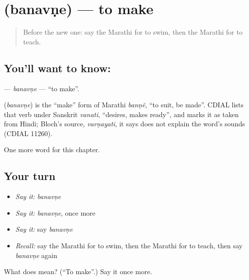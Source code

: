 \section[\texorpdfstring{\mr{बनवणे} (banavṇe)}{बनवणे (banavṇe)}]{ (banavṇe) — to make}

\label{lesson:MR-C82-banavne}



\begin{quote}
Before the new one: say the Marathi for to swim, then the Marathi for to teach.
\end{quote}

\subsection*{You'll want to know: }
\textbf{} — \emph{banavṇe} — \textquotedblleft{}to make\textquotedblright{}.

\begin{cousinweb}
\textbf{} (\emph{banavṇe}) is the \textquotedblleft{}make\textquotedblright{} form of Marathi \emph{banṇẽ}, \textquotedblleft{}to suit, be made\textquotedblright{}. CDIAL lists that verb under Sanskrit \emph{vanati}, \textquotedblleft{}desires, makes ready\textquotedblright{}, and marks it as taken from Hindi; Bloch's source, \emph{varṇayati}, it says does not explain the word's sounds (CDIAL 11260).
\end{cousinweb}

\begin{grammarlens}[title={What you've built}]
One more word for this chapter.
\end{grammarlens}

\subsection*{Your turn}
\begin{itemize}
\raggedright
  \item \emph{Say it:} \emph{banavṇe}
  \item \emph{Say it:} \emph{banavṇe}, once more
  \item \emph{Say it:} say \emph{banavṇe}
  \item \emph{Recall:} say the Marathi for to swim, then the Marathi for to teach, then say \emph{banavṇe} again
\end{itemize}

\begin{tcolorbox}[breakable,colback=teal!4,colframe=teal!35!black,title={Before you move on}]
What does  mean? (\textquotedblleft{}To make\textquotedblright{}.) Say it once more.
\end{tcolorbox}
